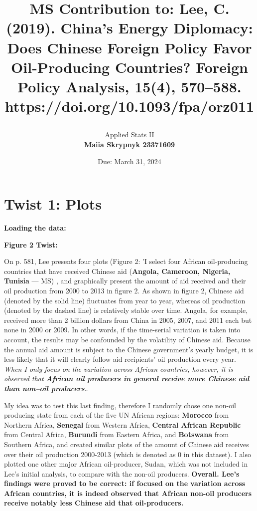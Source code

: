 \documentclass[12pt,letterpaper]{article}
\title{\textbf{MS Contribution to:} Lee, C. (2019). China’s Energy Diplomacy: Does Chinese Foreign Policy Favor Oil-Producing Countries? Foreign Policy Analysis, 15(4), 570–588. https://doi.org/10.1093/fpa/orz011

}
\date{Due: March 31, 2024}
\author{Applied Stats II \\ \vspace{\baselineskip}
	\textbf{Maiia Skrypnyk 23371609}}
\begin{document}
	\maketitle

\section{Twist 1: Plots}


\textbf{Loading the data:}
 


\noindent \textbf{Figure 2 Twist:}

On p. 581, Lee presents four plots (Figure 2: 'I select four African oil-producing countries that have received Chinese aid (\textbf{Angola, Cameroon, Nigeria, Tunisia }— MS) , and graphically present the amount of aid received and their oil production from 2000 to 2013 in figure 2. As shown in figure 2, Chinese aid (denoted by the solid line) fluctuates from year to year, whereas oil production (denoted by the dashed line) is relatively stable over time. Angola, for example, received more than 2 billion dollars from China in 2005, 2007, and 2011 each but none in 2000 or 2009. In other words, if the time-serial variation is taken into account, the results may be confounded by the volatility of Chinese aid. Because the annual aid amount is subject to the Chinese government’s yearly budget, it is less likely that it will clearly follow aid recipients’ oil production every year. \textit{When I only focus on the variation across African countries, however, it is observed that \textbf{African oil producers in general receive more Chinese aid than non–oil producers.}}.

My idea was to test this last finding, therefore I randomly chose one non-oil producing state from each of the five UN African regions: \textbf{Morocco} from Northern Africa, \textbf{Senegal} from Western Africa, \textbf{Central African Republic} from Central Africa, \textbf{Burundi} from Eastern Africa, and \textbf{Botswana} from Southern Africa, and created similar plots of the amount of Chinese aid receives over their oil production 2000-2013 (which is denoted as 0 in this dataset). I also plotted one other major African oil-producer, Sudan, which was not included in Lee's initial analysis, to compare with the non-oil producers. \textbf{Overall. Lee's findings were proved to be correct: if focused on the variation across African countries, it is indeed observed that African non-oil producers receive notably less Chinese aid that oil-producers. }
\end{document}
